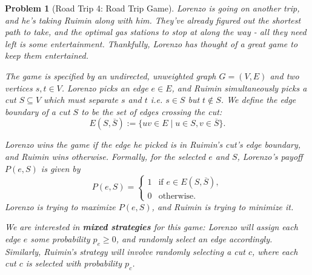\documentclass[10pt]{article}
\newtheorem{problem}{\sc\color{cit}Problem}
\begin{document}
\begin{problem}[Road Trip 4: Road Trip Game] Lorenzo is going on another trip, and he's taking Ruimin along with him. They've already figured out the shortest path to take, and the optimal gas stations to stop at along the way - all they need left is some entertainment. Thankfully, Lorenzo has thought of a great game to keep them entertained.  

The game is specified by an undirected, unweighted graph $G=(V,E)$ and two vertices $s,t\in V$. Lorenzo picks an edge $e \in E$, and Ruimin simultaneously picks a cut $S \subseteq V$ which must separate $s$ and $t$ i.e. $s \in S$ but $t \not\in S$. We define the edge boundary of a cut $S$ to be the set of edges crossing the cut:
\[
    E(S,\overline{S}) := \{uv \in E \mid u \in S, v \in \overline{S}\}.
\]

\noindent
Lorenzo wins the game if the edge he picked is in Ruimin's cut's edge boundary, and Ruimin wins otherwise. Formally, for the selected $e$ and $S$, Lorenzo's payoff $P(e, S)$ is given by
\[
    P(e,S) = \begin{cases} 1 & \text{if } e\in E(S,\overline{S}),\\
    0 & \text{otherwise.}\end{cases}
\]
Lorenzo is trying to maximize $P(e, S)$, and Ruimin is trying to minimize it. 

\noindent
We are interested in \textbf{mixed strategies} for this game: Lorenzo will assign each edge $e$ some probability $p_e \geq 0$, and randomly select an edge accordingly. Similarly, Ruimin's strategy will involve randomly selecting a cut $c$, where each cut $c$ is selected with probability $p_c$.


\end{problem}
\end{document}
